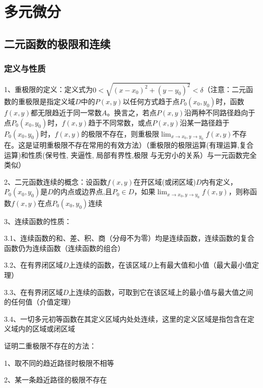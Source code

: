 \chapter{多元微分}

\section{二元函数的极限和连续}



\subsection{定义与性质}

1、重极限的定义：定义式为$0<\sqrt{\left(x-x_{0}\right)^{2}+\left(y-y_{0}\right)^{2}}<\delta$（注意：二元函数的重极限是指定义域$D$中的$P(x, y)$以任何方式趋于点$P_{0}\left(x_{0}, y_{0}\right)$时，函数$f(x, y)$都无限趋近于同一常数$A$。换言之，若点$P(x, y)$沿两种不同路径趋向于点$P_{0}\left(x_{0}, y_{0}\right)$时，$f(x, y)$趋于不同常数，或点$P(x, y)$沿某一路径趋于$P_{0}\left(x_{0}, y_{0}\right)$时，$f(x, y)$的极限不存在，则重极限$\lim_{x \rightarrow x_{0},y \rightarrow y_{0}} f(x, y)$不存在。这是证明重极限不存在常用的有效方法）（重极限的极限运算(有理运算,复合运算)和性质(保号性, 夹逼性, 局部有界性,极限 与无穷小的关系）与一元函数完全类似）

2、二元函数连续的概念：设函数$f(x, y)$在开区域(或闭区域)$D$内有定义，$P_{0}\left(x_{0}, y_{0}\right)$是$D$的内点或边界点,且$P_{0} \in D$，如果$\lim_{x \rightarrow x_{0},y \rightarrow y_{0}} f(x, y)$，则称函数$f(x, y)$在点$P_{0}\left(x_{0}, y_{0}\right)$连续

3、连续函数的性质：

3.1、连续函数的和、差、积、商（分母不为零）均是连续函数，连续函数的复合函数仍为连续函数（连续函数的组合）

3.2、在有界闭区域$D$上连续的函数，在该区域$D$上有最大值和小值（最大最小值定理）

3.3、在有界闭区域$D$上连续的函数，可取到它在该区域上的最小值与最大值之间的任何值（介值定理）

3.4、一切多元初等函数在其定义区域内处处连续，这里的定义区域是指包含在定义域内的区域或闭区域

证明二重极限不存在的方法：

1、取不同的趋近路径时极限不相等

2、某一条趋近路径的极限不存在



